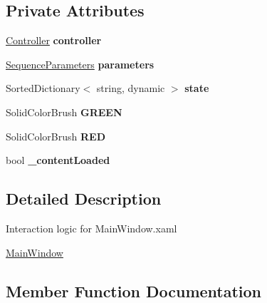 \subsection*{Private Attributes}
\begin{DoxyCompactItemize}
\item 
\mbox{\label{class_a_s_e6030_1_1_main_window_a2b388122bcbcc462675679d09465f431}} 
\hyperlink{class_a_s_e6030_1_1_controller}{Controller} {\bfseries controller}
\item 
\mbox{\label{class_a_s_e6030_1_1_main_window_a160236952bfdea25ba39ae37d78c81a5}} 
\hyperlink{class_a_s_e6030_1_1_sequence_parameters}{Sequence\+Parameters} {\bfseries parameters}
\item 
\mbox{\label{class_a_s_e6030_1_1_main_window_aa4b5b65983bb7226a44e06e13bcaf274}} 
Sorted\+Dictionary$<$ string, dynamic $>$ {\bfseries state}
\item 
\mbox{\label{class_a_s_e6030_1_1_main_window_aeab975c1ce7cb61e9335643b388f6eac}} 
Solid\+Color\+Brush {\bfseries G\+R\+E\+EN}
\item 
\mbox{\label{class_a_s_e6030_1_1_main_window_a5263c77c02edbe3ee3507eae6976368f}} 
Solid\+Color\+Brush {\bfseries R\+ED}
\item 
\mbox{\label{class_a_s_e6030_1_1_main_window_a89e1033a43d014d2bfea4ea332098698}} 
bool {\bfseries \+\_\+content\+Loaded}
\end{DoxyCompactItemize}


\subsection{Detailed Description}
Interaction logic for Main\+Window.\+xaml 

\hyperlink{class_a_s_e6030_1_1_main_window}{Main\+Window} 

\subsection{Member Function Documentation}
\mbox{\label{class_a_s_e6030_1_1_main_window_ae87e50858240332fce20264ac23638e8}} 
